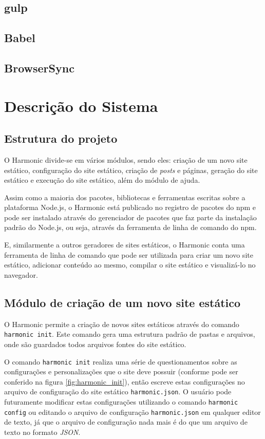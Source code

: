 \documentclass[ppginf, pep]{esinucpel}
\newcommand{\code}[1]{\texttt{#1}}
\begin{document}
\section{gulp}

\section{Babel}

\section{BrowserSync}

\chapter{Descrição do Sistema}

\section{Estrutura do projeto}

O Harmonic divide-se em vários módulos, sendo eles: criação de um novo site estático, configuração do site estático, criação de \textit{posts} e páginas, geração do site estático e execução do site estático, além do módulo de ajuda.

Assim como a maioria dos pacotes, bibliotecas e ferramentas escritas sobre a plataforma Node.js, o Harmonic está publicado no registro de pacotes do npm e pode ser instalado através do gerenciador de pacotes que faz parte da instalação padrão do Node.js, ou seja, através da ferramenta de linha de comando do npm.

E, similarmente a outros geradores de sites estáticos, o Harmonic conta uma ferramenta de linha de comando que pode ser utilizada para criar um novo site estático, adicionar conteúdo ao mesmo, compilar o site estático e visualizá-lo no navegador.

\section{Módulo de criação de um novo site estático}

O Harmonic permite a criação de novos sites estáticos através do comando \code{harmonic init}. Este comando gera uma estrutura padrão de pastas e arquivos, onde são guardados todos arquivos fontes do site estático.

O comando \code{harmonic init} realiza uma série de questionamentos sobre as configurações e personalizações que o site deve possuir (conforme pode ser conferido na figura \ref{fig:harmonic_init}), então escreve estas configurações no arquivo de configuração do site estático \code{harmonic.json}. O usuário pode futuramente modificar estas configurações utilizando o comando \code{harmonic config} ou editando o arquivo de configuração \code{harmonic.json} em qualquer editor de texto, já que o arquivo de configuração nada mais é do que um arquivo de texto no formato \emph{JSON}.
\end{document}
